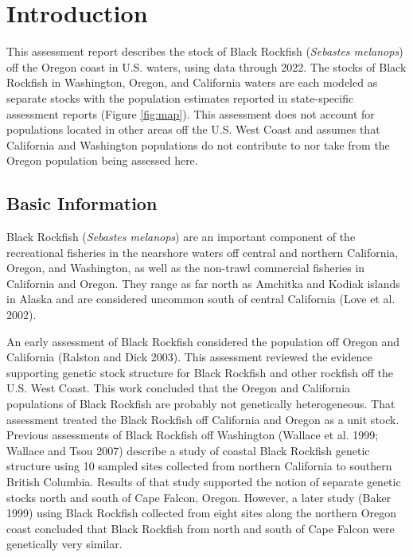 \documentclass[11pt,
  english,
  letterpaper,
]{article}
\begin{document}
\vspace{500cm}

\pagebreak
\setlength{\parskip}{5mm plus1mm minus1mm}
\setcounter{page}{1}
\renewcommand{\thefigure}{\arabic{figure}}
\renewcommand{\thetable}{\arabic{table}}
\setcounter{table}{0}
\setcounter{figure}{0}

\hypertarget{introduction}{%
\section{Introduction}\label{introduction}}

This assessment report describes the stock of Black Rockfish (\emph{Sebastes melanops}) off the Oregon coast in U.S. waters, using data through 2022. The stocks of Black Rockfish in Washington, Oregon, and California waters are each modeled as separate stocks with the population estimates reported in state-specific assessment reports (Figure \ref{fig:map}). This assessment does not account for populations located in other areas off the U.S. West Coast and assumes that California and Washington populations do not contribute to nor take from the Oregon population being assessed here.

\hypertarget{basic-information}{%
\subsection{Basic Information}\label{basic-information}}

Black Rockfish (\emph{Sebastes melanops}) are an important component of the recreational fisheries in the nearshore waters off central and northern California, Oregon, and Washington, as well as the non-trawl commercial fisheries in California and Oregon. They range as far north as Amchitka and Kodiak islands in Alaska and are considered uncommon south of central California (Love et al. 2002).

An early assessment of Black Rockfish considered the population off Oregon and California (Ralston and Dick 2003). This assessment reviewed the evidence supporting genetic stock structure for Black Rockfish and other rockfish off the U.S. West Coast. This work concluded that the Oregon and California populations of Black Rockfish are probably not genetically heterogeneous. That assessment treated the Black Rockfish off California and Oregon as a unit stock. Previous assessments of Black Rockfish off Washington (Wallace et al. 1999; Wallace and Tsou 2007) describe a study of coastal Black Rockfish genetic structure using 10 sampled sites collected from northern California to southern British Columbia. Results of that study supported the notion of separate genetic stocks north and south of Cape Falcon, Oregon. However, a later study (Baker 1999) using Black Rockfish collected from eight sites along the northern Oregon coast concluded that Black Rockfish from north and south of Cape Falcon were genetically very similar.
\end{document}
